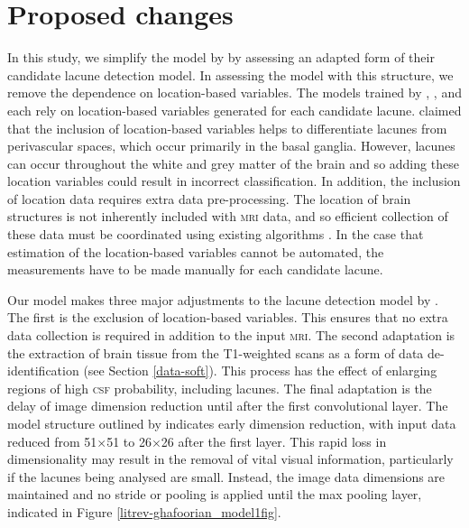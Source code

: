 \section{Proposed changes}\label{litrev-changes}

In this study, we simplify the model by \cite{GhafoorianM.2017Dml3} by assessing an adapted form of their candidate lacune detection model. In assessing the model with this structure, we remove the dependence on location-based variables. The models trained by \cite{UchiyamaYoshikazu2007Ioad}, \cite{Yokoyama2007}, and \cite{GhafoorianM.2017Dml3} each rely on location-based variables generated for each candidate lacune. \cite{GhafoorianM.2017Dml3} claimed that the inclusion of location-based variables helps to differentiate lacunes from perivascular spaces, which occur primarily in the basal ganglia. However, lacunes can occur throughout the white and grey matter of the brain \citep{WardlawJm2013Mosc} and so adding these location variables could result in incorrect classification. In addition, the inclusion of location data requires extra data pre-processing. The location of brain structures is not inherently included with \textsc{mri} data, and so efficient collection of these data must be coordinated using existing algorithms \citep{UchiyamaYoshikazu2007Ioad, Uchiyama2007b}. In the case that estimation of the location-based variables cannot be automated, the measurements have to be made manually for each candidate lacune.

Our model makes three major adjustments to the lacune detection model by \cite{GhafoorianM.2017Dml3}. The first is the exclusion of location-based variables. This ensures that no extra data collection is required in addition to the input \textsc{mri}. The second adaptation is the extraction of brain tissue from the T1-weighted scans as a form of data de-identification (see Section \ref{data-soft}). This process has the effect of enlarging regions of high \textsc{csf} probability, including lacunes. The final adaptation is the delay of image dimension reduction until after the first convolutional layer. The model structure outlined by \cite{GhafoorianM.2017Dml3} indicates early dimension reduction, with input data reduced from 51$\times$51 to 26$\times$26 after the first layer. This rapid loss in dimensionality may result in the removal of vital visual information, particularly if the lacunes being analysed are small. Instead, the image data dimensions are maintained and no stride or pooling is applied until the max pooling layer, indicated in Figure \ref{litrev-ghafoorian_model1fig}.


